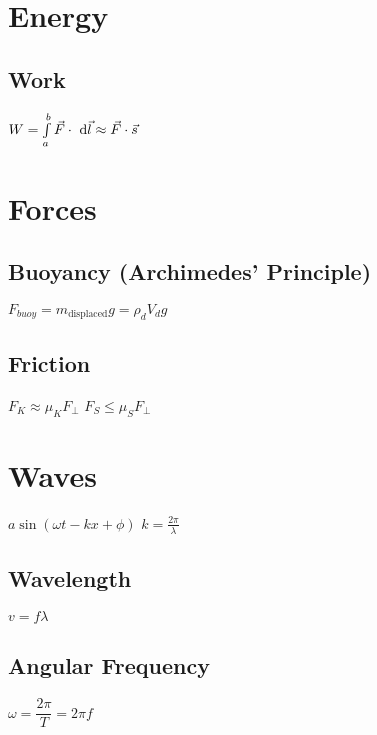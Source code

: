 	\section{Energy}

\subsection{Work}
\begin{itemize}
\itemt \(W = \int\limits_{a}^{b} \vec{F}\cdot \ \mathrm{d}\vec{l} \approx \vec{F} \cdot \vec{s}\)
\end{itemize}
				
	\section{Forces}

\subsection{Buoyancy (Archimedes' Principle)}			
\begin{itemize}
\itemt \( F_{buoy} = m_\mathrm{displaced}g = \rho_{d} V_{d}g \)
\end{itemize}				

\subsection{Friction}			
\begin{itemize}
\itemt \( F_{K} \approx \mu_K F_\perp \)
\itemt \( F_{S} \leq \mu_S F_\perp \)
\end{itemize}				
				
	\section{Waves}
\begin{itemize}
\itemt \( a \sin(\omega t - kx + \phi) \)
\itemt \( k = \frac{2\pi}{\lambda} \)
\end{itemize}


\subsection{Wavelength}			
\begin{itemize}
\itemt \( v = f\lambda \)
\end{itemize}

\subsection{Angular Frequency}
\begin{itemize}
\itemt \( \omega = \dfrac{2\pi}{T} = 2\pi f \)
\end{itemize}

